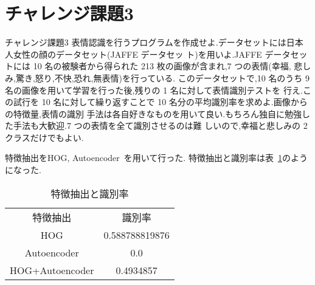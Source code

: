 \section{チャレンジ課題3}\label{section:challenge3}
\begin{itembox}{チャレンジ課題3}
  表情認識を行うプログラムを作成せよ.データセットには日本人女性の顔のデータセット(JAFFE データセッ ト)を用いよ.JAFFE データセットには 10 名の被験者から得られた 213 枚の画像が含まれ,7 つの表情(幸福, 悲しみ,驚き,怒り,不快,恐れ,無表情)を行っている.
  このデータセットで,10 名のうち 9 名の画像を用いて学習を行った後,残りの 1 名に対して表情識別テストを 行え.この試行を 10 名に対して繰り返すことで 10 名分の平均識別率を求めよ.画像からの特徴量,表情の識別 手法は各自好きなものを用いて良い.もちろん独自に勉強した手法も大歓迎.7 つの表情を全て識別させるのは難 しいので,幸福と悲しみの 2 クラスだけでもよい.
\end{itembox}

特徴抽出をHOG, Autoencoder~\cite{autoencoder}を用いて行った.
特徴抽出と識別率は表~\ref{tbl:feature-extraction-score}のようになった.

\begin{table}[htbp]
  \begin{center}
    \begin{tabular}{cc}
      特徴抽出 & 識別率 \\
      HOG & 0.588788819876  \\
      Autoencoder & 0.0 \\
      HOG+Autoencoder & 0.4934857  \\
    \end{tabular}
    \caption{特徴抽出と識別率}
    \label{tbl:feature-extraction-score}
  \end{center}
\end{table}

